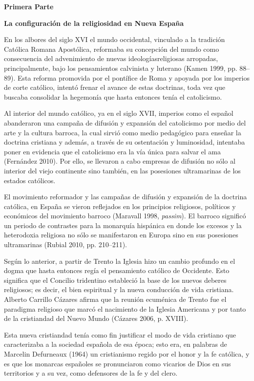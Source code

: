\bigskip
\textbf{Primera Parte}

\textbf{La configuración de la religiosidad en Nueva España}

En los albores del siglo XVI el mundo occidental, vinculado a la tradición
Católica Romana Apostólica, reformaba su concepción del mundo como consecuencia
del advenimiento de nuevas ideologías\linebreak religiosas arropadas, principalmente,
bajo los pensamientos calvinista y luterano (Kamen 1999, pp. 88--89). Esta reforma
promovida por el pontífice de Roma y apoyada por los imperios de corte
católico, intentó frenar el avance de estas doctrinas, toda vez que buscaba
consolidar la hegemonía que hasta entonces tenía el catolicismo. 


Al interior del mundo católico, ya en el siglo XVII, imperios como el español
abanderaron una campaña de difusión y expansión del catolicismo por medio del
arte y la cultura barroca, la cual sirvió como medio pedagógico para enseñar la
doctrina cristiana y además, a través de su ostentación y luminosidad,
intentaba poner en evidencia que el catolicismo era la vía única para salvar el
ama (Fernández 2010).  Por ello, se llevaron a cabo empresas de difusión no
sólo al interior del viejo continente sino también, en las posesiones
ultramarinas de los estados católicos. 


El movimiento reformador y las campañas de difusión y expansión de la doctrina
católica, en España se vieron reflejados en los principios religiosos,
políticos y económicos del movimiento barroco (Maravall 1998,
\textit{passim}). El barroco significó un periodo de contrastes para la
monarquía hispánica en donde los excesos y la heterodoxia religiosa no sólo se
manifestaron en Europa sino en sus posesiones ultramarinas (Rubial 2010, pp.
210--211).

\enlargethispage{1\baselineskip} 
Según lo anterior, a partir de Trento la Iglesia hizo un cambio profundo en el
dogma que hasta entonces regía el pensamiento católico de Occidente. Esto
significa que el Concilio tridentino estableció la base de los nuevos deberes
religiosos; es decir, el bien espiritual y la nueva conducción de vida
cristiana. Alberto Carrillo Cázares afirma que la reunión ecuménica de Trento
fue el paradigma religioso que marcó el nacimiento de la Iglesia Americana y
por tanto de la cristiandad del Nuevo Mundo (Cázares 2006, p. XVIII).


Esta nueva cristiandad tenía como fin justificar el modo de vida cristiano que
caracterizaba a la sociedad española de esa época; esto era, en palabras de
Marcelin Defurneaux (1964)  un cristianismo regido por el honor y la fe
católica, y es que los monarcas españoles se pronunciaron como vicarios de Dios
en sus territorios y a su vez, como defensores de la fe y del clero. 


